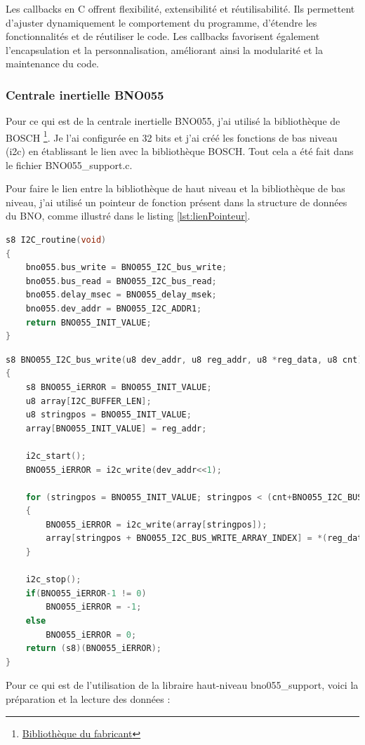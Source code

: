 {{	Les callbacks en C offrent flexibilité, extensibilité et réutilisabilité. Ils permettent d'ajuster dynamiquement le comportement du programme, d'étendre les fonctionnalités et de réutiliser le code. Les callbacks favorisent également l'encapsulation et la personnalisation, améliorant ainsi la modularité et la maintenance du code.	
	}
	
	\clearpage
	\subsubsection{Centrale inertielle BNO055}
	Pour ce qui est de la centrale inertielle BNO055, j'ai utilisé la bibliothèque de BOSCH \footnote{\href{https://github.com/BoschSensortec/BNO055_driver}{Bibliothèque du fabricant}}. Je l'ai configurée en 32 bits et j'ai créé les fonctions de bas niveau (i2c) en établissant le lien avec la bibliothèque BOSCH. Tout cela a été fait dans le fichier BNO055\_support.c.
	
	Pour faire le lien entre la bibliothèque de haut niveau et la bibliothèque de bas niveau, j'ai utilisé un pointeur de fonction présent dans la structure de données du BNO, comme illustré dans le listing \ref{lst:lienPointeur}.
	
\begin{lstlisting}[frame=single, label={lst:lienPointeur}, language=C, caption={Code lien pointeur de fonction}, captionpos=b]
s8 I2C_routine(void)
{
	bno055.bus_write = BNO055_I2C_bus_write;
	bno055.bus_read = BNO055_I2C_bus_read;
	bno055.delay_msec = BNO055_delay_msek;
	bno055.dev_addr = BNO055_I2C_ADDR1;
	return BNO055_INIT_VALUE;
}
\end{lstlisting}
\begin{lstlisting}[frame=single, language=C, caption={Code écriture i2c au BNO055}, captionpos=b, breaklines=true]
s8 BNO055_I2C_bus_write(u8 dev_addr, u8 reg_addr, u8 *reg_data, u8 cnt)
{
	s8 BNO055_iERROR = BNO055_INIT_VALUE;
	u8 array[I2C_BUFFER_LEN];
	u8 stringpos = BNO055_INIT_VALUE;
	array[BNO055_INIT_VALUE] = reg_addr;
	
	i2c_start();
	BNO055_iERROR = i2c_write(dev_addr<<1);
	
	for (stringpos = BNO055_INIT_VALUE; stringpos < (cnt+BNO055_I2C_BUS_WRITE_ARRAY_INDEX); stringpos++)
	{
		BNO055_iERROR = i2c_write(array[stringpos]);
		array[stringpos + BNO055_I2C_BUS_WRITE_ARRAY_INDEX] = *(reg_data + stringpos);
	}
	
	i2c_stop();
	if(BNO055_iERROR-1 != 0)
		BNO055_iERROR = -1;
	else
		BNO055_iERROR = 0;
	return (s8)(BNO055_iERROR);
}
\end{lstlisting}
	Pour ce qui est de l'utilisation de la libraire haut-niveau bno055\_support, voici la préparation et la lecture des données : 
	
}
